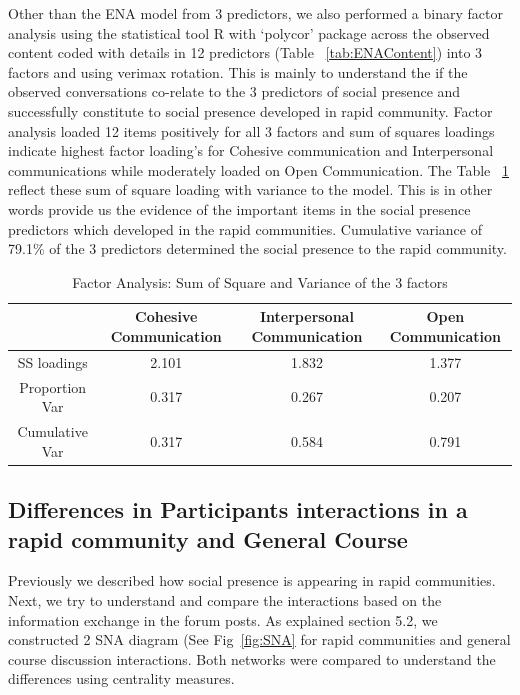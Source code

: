 \documentclass[manuscript,screen,review]{acmart}
\begin{document}
Other than the ENA model from 3 predictors, we also performed a binary factor analysis using the statistical tool R with ‘polycor’ package across the observed content coded with details in 12 predictors (Table ~\ref{tab:ENAContent}) into 3 factors and using verimax rotation. This is mainly to understand the if the observed conversations co-relate to the 3 predictors of social presence and successfully constitute to social presence developed in rapid community. Factor analysis loaded 12 items positively for all 3 factors and sum of squares loadings indicate highest factor loading's for Cohesive communication and Interpersonal communications while moderately loaded on Open Communication. The Table ~\ref{tab:FA} reflect these sum of square loading with variance to the model. This is in other words provide us the evidence of the important items in the social presence predictors which developed in the rapid communities. Cumulative variance of 79.1\% of the 3 predictors determined the social presence to the rapid community. 

\begin{table}[h!]
\caption{Factor Analysis: Sum of Square and Variance of the 3 factors }
\label{tab:FA}
\centering
    \begin{tabular}{c|c|c|c}
    \toprule
     & Cohesive Communication & Interpersonal Communication & Open Communication  \\
     \midrule
     SS loadings &  2.101 &  1.832 &  1.377 \\
    Proportion Var &  0.317 &  0.267  &  0.207 \\
    Cumulative Var &  0.317 &  0.584  & 0.791 \\
    \bottomrule
    \end{tabular}
    \end{table}



\subsection{Differences in Participants interactions in a rapid community and General Course}

Previously we described how social presence is appearing in rapid communities. Next, we try to understand and compare the interactions based on the information exchange in the forum posts. As explained section 5.2, we constructed 2 SNA diagram (See Fig~\ref{fig:SNA} for rapid communities and general course discussion interactions. Both networks were compared to understand the differences using centrality measures.   
\end{document}
